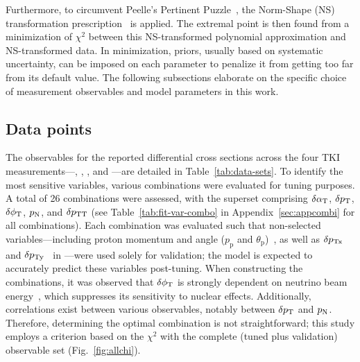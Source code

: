 Furthermore, to circumvent Peelle's Pertinent Puzzle~\cite{PPP_FNL,Chakrani:2023htw}, the Norm-Shape (NS) transformation prescription~\cite{DAgostini:1993arp,Hanson:2005mrg} is applied. 
The extremal point is then found from a minimization of $\chi^2$ between this NS-transformed polynomial approximation and NS-transformed data. 
In minimization, priors, usually based on systematic uncertainty, can be imposed on each parameter to penalize it from getting too far from its default value. 
The following subsections elaborate on the specific choice of measurement observables and model parameters in this work.

\subsection{\label{sec:tuning-obs-choice} Data points}
The observables for the reported differential cross sections across the four TKI measurements---\ttkzpi, \ttkpip, \minzpi, and \minpiz---are detailed in Table~\ref{tab:data-sets}. 
To identify the most sensitive variables, various combinations were evaluated  for tuning purposes. 
A total of 26 combinations were assessed,  with the superset comprising $\delta\alpha_\textrm{T}$, $\delta p_\textrm{T}$, $\delta\phi_\textrm{T}$, $p_\textrm{N}$, and $\delta p_\textrm{TT}$ (see Table~\ref{tab:fit-var-combo} in Appendix~\ref{sec:appcombi} for all combinations). 
Each combination was evaluated such that non-selected variables---including proton momentum and angle ($p_\text{p}$ and $\theta_\text{p}$)~\cite{MINERvA:2018hba}, as well as $\delta p_\textrm{Tx}$ and $\delta p_\textrm{Ty}$~\cite{MINERvA:2019ope} in \minzpi---were used solely for validation; the model is expected to accurately predict these variables post-tuning. 
When constructing the combinations, it was observed that $\delta\phi_\textrm{T}$ is strongly dependent  on neutrino beam energy~\cite{Lu:2015tcr}, which suppresses its sensitivity to nuclear effects. 
Additionally, correlations exist between various observables, notably between $\delta p_\textrm{T}$ and $p_\textrm{N}$. 
Therefore, determining the optimal combination is not straightforward; this study employs a criterion based on  the $\chi^2$ with the complete (tuned plus validation) observable set (Fig.~\ref{fig:allchi}).


